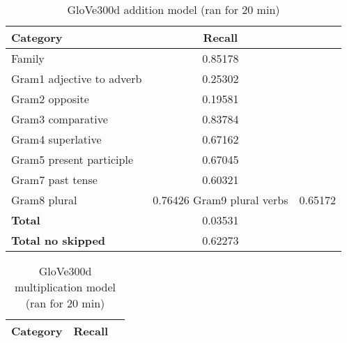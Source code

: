 \begin{center}
    \begin{table}[h!]
        \begin{tabular}{| l | c | r}
        	\hline
        	\textbf{Category} &    \textbf{Recall}\\ \hline
        	Family 						& 0.85178 \\
        	Gram1 adjective to adverb 	& 0.25302 \\
        	Gram2 opposite 				& 0.19581 \\
        	Gram3 comparative 			& 0.83784 \\
        	Gram4 superlative 			& 0.67162 \\
        	Gram5 present participle	& 0.67045 \\
        	Gram7 past tense 			& 0.60321 \\
        	Gram8 plural 				& 0.76426
        	Gram9 plural verbs 			& 0.65172 \\
        	\textbf{Total}				& 0.03531 \\
        	\textbf{Total no skipped}	& 0.62273 \\ \hline
        \end{tabular}
    \caption{GloVe300d addition model (ran for 20 min)}
    \label{table:glove300d_multiplication}
    \end{table}
    
    \begin{table}[h!]
        \begin{tabular}{| l | c | r}
        	\hline
        	\textbf{Category} &    \textbf{Recall}\\ \hline
        \end{tabular}
    \caption{GloVe300d multiplication model (ran for 20 min)}
    \label{table:glove300d_multiplication}
    \end{table}
\end{center}
